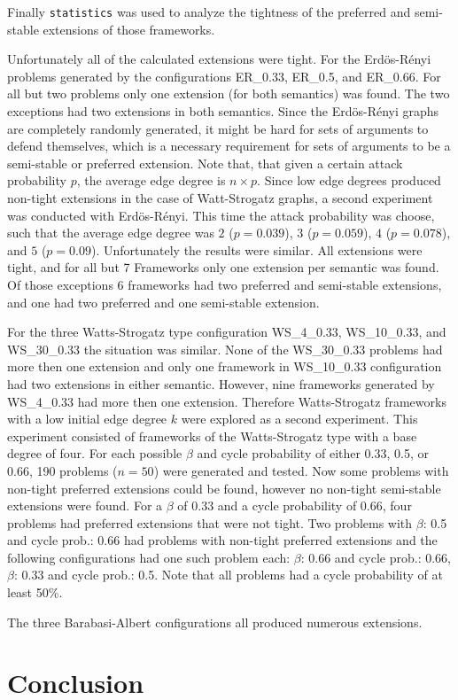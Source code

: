 \documentclass[parskip=half]{scrartcl}
\begin{document}
Finally \texttt{statistics} was used to analyze the tightness of the preferred and
semi-stable extensions of those frameworks.

Unfortunately all of the calculated extensions were tight.
For the Erdös-Rényi problems generated by the configurations ER\_0.33, ER\_0.5, and ER\_0.66.
For all but two problems only one extension (for both semantics) was found.
The two exceptions had two extensions in both semantics.
Since the Erdös-Rényi graphs are completely randomly generated, it might be hard for sets of
arguments to defend themselves, which is a necessary requirement for sets of arguments to
be a semi-stable or preferred extension.
Note that, that given a certain attack probability $p$, the average edge degree is
$n\times p$. Since low edge degrees produced non-tight extensions in the case of Watt-Strogatz
graphs, a second experiment was conducted with Erdös-Rényi. This time the
attack probability was choose, such that the average edge degree was $2$
($p=0.039$), $3$ ($p=0.059$), $4$ ($p=0.078$), and $5$ ($p=0.09$).
Unfortunately the results were similar. All extensions were tight, and for all but 7 Frameworks
only one extension per semantic was found. Of those exceptions 6 frameworks had two preferred and
semi-stable extensions, and one had two preferred and one semi-stable extension.

For the three Watts-Strogatz type configuration WS\_4\_0.33, WS\_10\_0.33, and WS\_30\_0.33 the
situation was similar. None of the WS\_30\_0.33 problems had more then one extension and only
one framework in WS\_10\_0.33 configuration had two extensions in either semantic.
However, nine frameworks generated by WS\_4\_0.33 had more then one extension.
Therefore Watts-Strogatz frameworks
with a low initial edge degree $k$ were explored as a second experiment. This experiment consisted
of frameworks of the Watts-Strogatz type with a base degree of four. For each possible $\beta$
and cycle probability of either 0.33, 0.5, or 0.66, 190 problems ($n=50$) were generated and tested.
Now some problems with non-tight preferred extensions could be found, however no non-tight semi-stable
extensions were found. For a $\beta$ of 0.33 and a cycle probability of 0.66, four problems
had preferred extensions that were not tight. Two problems with $\beta$: 0.5 and cycle prob.: 0.66
had problems with non-tight preferred extensions and the following configurations had one such
problem each: $\beta$: 0.66 and cycle prob.: 0.66, $\beta$: 0.33 and cycle prob.: 0.5.
Note that all problems had a cycle probability of at least 50\%.


The three Barabasi-Albert configurations all produced numerous extensions.


\section{Conclusion}
\label{conclusion}

\printbibliography
\end{document}
